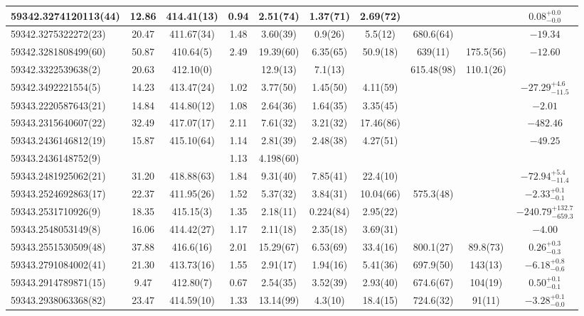 \documentclass[preprint2, trackchanges]{aastex631}
\begin{document}
{{\begin{longtable}{lccccccccc}
59342.3274120113(44) & 12.86 & 414.41(13) & 0.94 & 2.51(74) & 1.37(71)  & 2.69(72) &  &  & $0.08^{+0.0}_{-0.0}$ \\
\hline
59342.3275322272(23) & 20.47 & 411.67(34) & 1.48 & 3.60(39) & 0.9(26)  & 5.5(12) & 680.6(64) &  & $-19.34$ \\
\hline
59342.3281808499(60) & 50.87 & 410.64(5) & 2.49 & 19.39(60) & 6.35(65)  & 50.9(18) & 639(11) & 175.5(56) & $-12.60$ \\
\hline
59342.3322539638(2) & 20.63 & 412.10(0) &  & 12.9(13) & 7.1(13)  &  & 615.48(98) & 110.1(26) &  \\
\hline
59342.3492221554(5) & 14.23 & 413.47(24) & 1.02 & 3.77(50) & 1.45(50)  & 4.11(59) &  &  & $-27.29^{+4.6}_{-11.5}$ \\
\hline
59343.2220587643(21) & 14.84 & 414.80(12) & 1.08 & 2.64(36) & 1.64(35)  & 3.35(45) &  &  & $-2.01$ \\
\hline
59343.2315640607(22) & 32.49 & 417.07(17) & 2.11 & 7.61(32) & 3.21(32)  & 17.46(86) &  &  & $-482.46$ \\
\hline
59343.2436146812(19) & 15.87 & 415.10(64) & 1.14 & 2.81(39) & 2.48(38)  & 4.27(51) &  &  & $-49.25$ \\
59343.2436148752(9) &  &  & 1.13 & 4.198(60) &   &  &  &  &  \\
\hline
59343.2481925062(21) & 31.20 & 418.88(63) & 1.84 & 9.31(40) & 7.85(41)  & 22.4(10) &  &  & $-72.94^{+5.4}_{-11.4}$ \\
\hline
59343.2524692863(17) & 22.37 & 411.95(26) & 1.52 & 5.37(32) & 3.84(31)  & 10.04(66) & 575.3(48) &  & $-2.33^{+0.1}_{-0.1}$ \\
\hline
59343.2531710926(9) & 18.35 & 415.15(3) & 1.35 & 2.18(11) & 0.224(84)  & 2.95(22) &  &  & $-240.79^{+132.7}_{-659.3}$ \\
\hline
59343.2548053149(8) & 16.06 & 414.42(27) & 1.17 & 2.11(18) & 2.35(18)  & 3.69(31) &  &  & $-4.00$ \\
\hline
59343.2551530509(48) & 37.88 & 416.6(16) & 2.01 & 15.29(67) & 6.53(69)  & 33.4(16) & 800.1(27) & 89.8(73) & $0.26^{+0.3}_{-0.3}$ \\
\hline
59343.2791084002(41) & 21.30 & 413.73(16) & 1.55 & 2.91(17) & 1.94(16)  & 5.41(36) & 697.9(50) & 143(13) & $-6.18^{+0.8}_{-0.6}$ \\
\hline
59343.2914789871(15) & 9.47 & 412.80(7) & 0.67 & 2.54(35) & 3.52(39)  & 2.93(40) & 674.6(67) & 104(19) & $0.50^{+0.1}_{-0.1}$ \\
\hline
59343.2938063368(82) & 23.47 & 414.59(10) & 1.33 & 13.14(99) & 4.3(10)  & 18.4(15) & 724.6(32) & 91(11) & $-3.28^{+0.1}_{-0.0}$ \\

\end{longtable}}}
\end{document}
